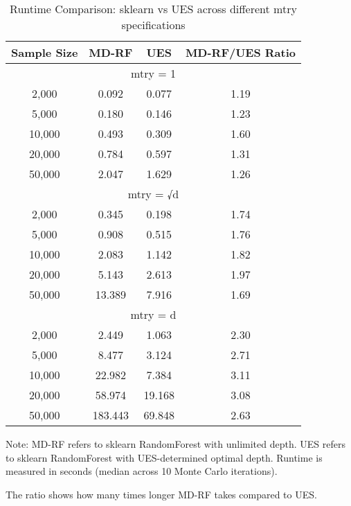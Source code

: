 \begin{table}[htbp]
\centering
\caption{Runtime Comparison: sklearn vs UES across different mtry specifications}
\label{tab:mtry_comparison}
\begin{tabular}{c|c|c|c}
\hline
Sample Size & MD-RF & UES & MD-RF/UES Ratio \\
\hline

\multicolumn{4}{c}{mtry = 1} \\
\hline
2,000 & 0.092 & 0.077 & 1.19 \\
5,000 & 0.180 & 0.146 & 1.23 \\
10,000 & 0.493 & 0.309 & 1.60 \\
20,000 & 0.784 & 0.597 & 1.31 \\
50,000 & 2.047 & 1.629 & 1.26 \\
\hline

\multicolumn{4}{c}{mtry = √d} \\
\hline
2,000 & 0.345 & 0.198 & 1.74 \\
5,000 & 0.908 & 0.515 & 1.76 \\
10,000 & 2.083 & 1.142 & 1.82 \\
20,000 & 5.143 & 2.613 & 1.97 \\
50,000 & 13.389 & 7.916 & 1.69 \\
\hline

\multicolumn{4}{c}{mtry = d} \\
\hline
2,000 & 2.449 & 1.063 & 2.30 \\
5,000 & 8.477 & 3.124 & 2.71 \\
10,000 & 22.982 & 7.384 & 3.11 \\
20,000 & 58.974 & 19.168 & 3.08 \\
50,000 & 183.443 & 69.848 & 2.63 \\
\hline
\end{tabular}
\begin{tablenotes}
    \small
    \item Note: MD-RF refers to sklearn RandomForest with unlimited depth. UES refers to sklearn RandomForest with UES-determined optimal depth. Runtime is measured in seconds (median across 10 Monte Carlo iterations). 
    \item The ratio shows how many times longer MD-RF takes compared to UES.
\end{tablenotes}
\end{table}